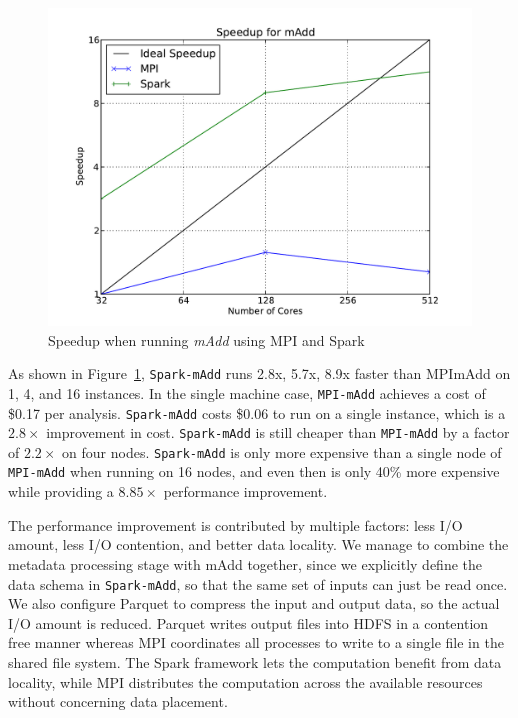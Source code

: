 \documentclass{acm_proc_article-sp}
\begin{document}
\begin{figure}[h]
\begin{center}
\includegraphics[width=0.99\linewidth]{graphs/speedup_madd.pdf}
\end{center}
\caption{Speedup when running \textit{mAdd} using MPI and Spark}
\label{fig:madd-speedup}
\end{figure}

As shown in Figure~\ref{fig:madd-speedup}, \texttt{Spark-mAdd} runs 2.8x, 5.7x, 8.9x faster than
MPImAdd on 1, 4, and 16 instances. In the single machine case, \texttt{MPI-mAdd} achieves a cost of \$0.17 per
analysis. \texttt{Spark-mAdd} costs \$0.06 to run on a single instance, which is a $2.8\times$ improvement in
cost. \texttt{Spark-mAdd} is still cheaper than \texttt{MPI-mAdd} by a factor of $2.2\times$ on four nodes.
\texttt{Spark-mAdd} is only more expensive than a single node of \texttt{MPI-mAdd} when running on 16 nodes,
and even then is only 40\% more expensive while providing a $8.85\times$ performance improvement.

The performance improvement is contributed by multiple factors: less I/O amount, less I/O contention,
and better data locality. We manage to combine the metadata processing stage with mAdd together,
since we explicitly define the data schema in \texttt{Spark-mAdd}, so that the same set of inputs can just
be read once. We also configure Parquet to compress the input and output data, so the actual I/O
amount is reduced. Parquet writes output files into HDFS in a contention free manner whereas MPI
coordinates all processes to write to a single file in the shared file system. The Spark framework lets the
computation benefit from data locality, while MPI distributes the computation across the available
resources without concerning data placement.
\end{document}
